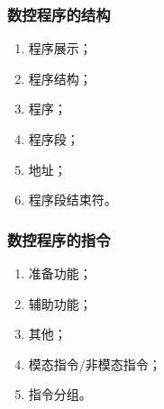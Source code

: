 \subsubsection{数控程序的结构}
\begin{enumerate}[1、]
	\item 程序展示；
	\item 程序结构；
	\item 程序；
	\item 程序段；
	\item 地址；
	\item 程序段结束符。
\end{enumerate}
\subsubsection{数控程序的指令}
\begin{enumerate}[1、]
	\item 准备功能；
	\item 辅助功能；
	\item 其他；
	\item 模态指令/非模态指令；
	\item 指令分组。
\end{enumerate}
